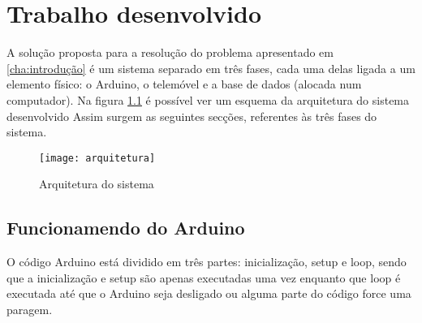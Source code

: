 \chapter{Trabalho desenvolvido}
\label{cha:trabalho desenvolvido}

A solução proposta para a resolução do problema apresentado em \ref{cha:introdução} é um sistema separado em três fases, cada uma delas ligada a um elemento físico: o Arduino, o telemóvel e a base de dados (alocada num computador). 
Na figura \ref{fig:arquitetura} é possível ver um esquema da arquitetura do sistema desenvolvido
Assim surgem as seguintes secções, referentes às três fases do sistema.

\begin{figure}[hbtp]
	\centering
	\texttt{[image: arquitetura]}
	\caption{Arquitetura do sistema}
	\label{fig:arquitetura}
\end{figure}

\section{Funcionamendo do Arduino}
\label{sec:funcionamento_do_arduino}
O código Arduino está dividido em três partes: inicialização, setup e loop, sendo que a inicialização e setup são apenas executadas uma vez enquanto que loop é executada até que o Arduino seja desligado ou alguma parte do código force uma paragem.

